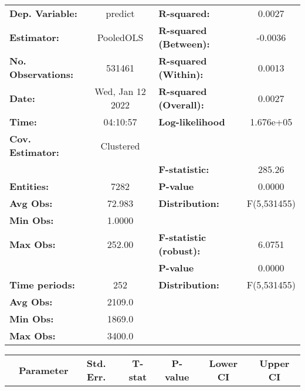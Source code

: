 \begin{center}
\begin{tabular}{lclc}
\toprule
\textbf{Dep. Variable:}    &      predict       & \textbf{  R-squared:         }   &      0.0027      \\
\textbf{Estimator:}        &     PooledOLS      & \textbf{  R-squared (Between):}  &     -0.0036      \\
\textbf{No. Observations:} &       531461       & \textbf{  R-squared (Within):}   &      0.0013      \\
\textbf{Date:}             &  Wed, Jan 12 2022  & \textbf{  R-squared (Overall):}  &      0.0027      \\
\textbf{Time:}             &      04:10:57      & \textbf{  Log-likelihood     }   &    1.676e+05     \\
\textbf{Cov. Estimator:}   &     Clustered      & \textbf{                     }   &                  \\
\textbf{}                  &                    & \textbf{  F-statistic:       }   &      285.26      \\
\textbf{Entities:}         &        7282        & \textbf{  P-value            }   &      0.0000      \\
\textbf{Avg Obs:}          &       72.983       & \textbf{  Distribution:      }   &   F(5,531455)    \\
\textbf{Min Obs:}          &       1.0000       & \textbf{                     }   &                  \\
\textbf{Max Obs:}          &       252.00       & \textbf{  F-statistic (robust):} &      6.0751      \\
\textbf{}                  &                    & \textbf{  P-value            }   &      0.0000      \\
\textbf{Time periods:}     &        252         & \textbf{  Distribution:      }   &   F(5,531455)    \\
\textbf{Avg Obs:}          &       2109.0       & \textbf{                     }   &                  \\
\textbf{Min Obs:}          &       1869.0       & \textbf{                     }   &                  \\
\textbf{Max Obs:}          &       3400.0       & \textbf{                     }   &                  \\
\bottomrule
\end{tabular}
\begin{tabular}{lcccccc}
                & \textbf{Parameter} & \textbf{Std. Err.} & \textbf{T-stat} & \textbf{P-value} & \textbf{Lower CI} & \textbf{Upper CI}  \\

\end{tabular}
\end{center}
